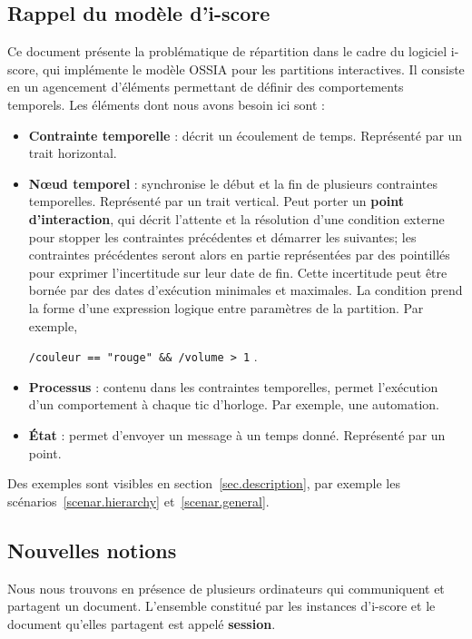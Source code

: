 \documentclass{article}
\newcommand\ossia{OSSIA\xspace}
\newcommand\vocab[1]{\textbf{#1}}
\begin{document}
\subsection{Rappel du modèle d'i-score}
Ce document présente la problématique de répartition dans le cadre du logiciel i-score, qui implémente le modèle \ossia\cite{celerier2015ossia} pour les partitions interactives.
Il consiste en un agencement d'éléments permettant de définir des comportements temporels. 
Les éléments dont nous avons besoin ici sont : 
\begin{itemize}
	\item \vocab{Contrainte temporelle} : décrit un écoulement de temps. 
    Représenté par un trait horizontal. 
	\item \vocab{Nœud temporel} : synchronise le début et la fin de plusieurs contraintes temporelles. Représenté par un trait vertical.
	Peut porter un \vocab{point d'interaction}, qui décrit l'attente et la résolution d'une condition externe pour stopper les contraintes précédentes et démarrer les suivantes; les contraintes précédentes seront alors en partie représentées par des pointillés pour exprimer l'incertitude sur leur date de fin. 
    Cette incertitude peut être bornée par des dates d'exécution minimales et maximales.
    La condition prend la forme d'une expression logique entre paramètres de la partition. Par exemple, 
    
    \lstinline|/couleur == "rouge" && /volume > 1| .
	\item \vocab{Processus} : contenu dans les contraintes temporelles, permet l'exécution d'un comportement à chaque tic d'horloge. Par exemple, une automation.
	\item \vocab{État} : permet d'envoyer un message à un temps donné. Représenté par un point.
\end{itemize}
Des exemples sont visibles en section~\ref{sec.description}, par exemple les scénarios~\ref{scenar.hierarchy} et~\ref{scenar.general}.

\subsection{Nouvelles notions}
Nous nous trouvons en présence de plusieurs ordinateurs qui communiquent et partagent un document.
L'ensemble constitué par les instances d'i-score et le document qu'elles partagent est appelé \vocab{session}.
\end{document}

